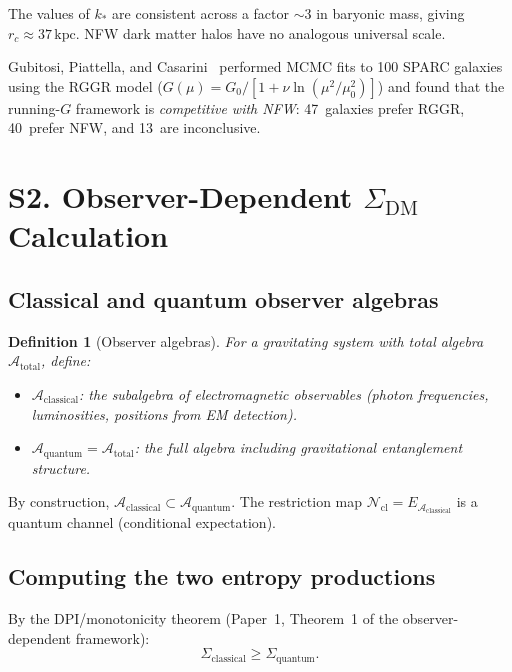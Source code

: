 \documentclass[aps,prd,preprint,superscriptaddress,longbibliography]{revtex4-2}
\newtheorem{definition}[theorem]{Definition}
\newcommand{\chan}{\mathcal{N}}
\begin{document}
The values of $k_*$ are consistent across a factor $\sim 3$ in
baryonic mass, giving $r_c \approx 37\,\mathrm{kpc}$.  NFW dark
matter halos have no analogous universal scale.

Gubitosi, Piattella, and Casarini~\cite{Gubitosi2024} performed
MCMC fits to 100 SPARC galaxies using the RGGR model
($G(\mu) = G_0/[1 + \nu\ln(\mu^2/\mu_0^2)]$) and found that the
running-$G$ framework is \emph{competitive with NFW}: 47~galaxies
prefer RGGR, 40~prefer NFW, and 13~are inconclusive.

\section{S2. Observer-Dependent $\Sigma_{\mathrm{DM}}$ Calculation}
\label{sec:observer_DM}

\subsection{Classical and quantum observer algebras}

\begin{definition}[Observer algebras]
For a gravitating system with total algebra $\mathcal{A}_{\mathrm{total}}$,
define:
\begin{itemize}
\item $\mathcal{A}_{\mathrm{classical}}$: the subalgebra of
  electromagnetic observables (photon frequencies, luminosities,
  positions from EM detection).
\item $\mathcal{A}_{\mathrm{quantum}} = \mathcal{A}_{\mathrm{total}}$:
  the full algebra including gravitational entanglement structure.
\end{itemize}
\end{definition}

By construction, $\mathcal{A}_{\mathrm{classical}} \subset
\mathcal{A}_{\mathrm{quantum}}$.  The restriction map
$\chan_{\mathrm{cl}} = E_{\mathcal{A}_{\mathrm{classical}}}$ is a
quantum channel (conditional expectation).

\subsection{Computing the two entropy productions}

By the DPI/monotonicity theorem (Paper~1, Theorem~1 of the
observer-dependent framework):
\begin{equation}
\Sigma_{\mathrm{classical}} \ge \Sigma_{\mathrm{quantum}}.
\label{eq:monotonicity}
\end{equation}
\end{document}
